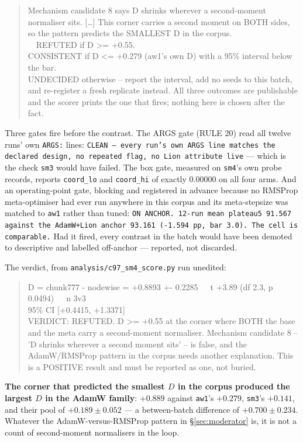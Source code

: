\documentclass[10pt,letterpaper]{article}
\newcommand{\Dstat}{D}                         %
\newcommand{\arm}[1]{\texttt{#1}}
\begin{document}
\begin{quote}\ttfamily\footnotesize
Mechanism candidate 8 says D shrinks wherever a second-moment normaliser sits. […] This corner
carries a second moment on BOTH sides, so the pattern predicts the SMALLEST D in the corpus.\\
\ \ REFUTED if D >= +0.55.\\
CONSISTENT if D <= +0.279 (aw1's own D) with a 95\% interval below the bar.\\
UNDECIDED otherwise -- report the interval, add no seeds to this batch, and re-register a fresh
replicate instead. All three outcomes are publishable and the scorer prints the one that fires;
nothing here is chosen after the fact.
\end{quote}

Three gates fire before the contrast. The ARGS gate (RULE 20) read all twelve runs' own
\texttt{ARGS:} lines: \texttt{CLEAN --- every run's own ARGS line matches the declared design, no
repeated flag, no Lion attribute live} --- which is the check \arm{sm3} would have failed. The box
gate, measured on \arm{sm4}'s own probe records, reports \texttt{coord\_lo} and \texttt{coord\_hi}
of exactly 0.00000 on all four arms. And an operating-point gate, blocking and registered in
advance because no RMSProp meta-optimiser had ever run anywhere in this corpus and its
meta-stepsize was matched to \arm{aw1} rather than tuned: \texttt{ON ANCHOR. 12-run mean plateau5
91.567 against the AdamW+Lion anchor 93.161 (-1.594 pp, bar 3.0). The cell is comparable.} Had it
fired, every contrast in the batch would have been demoted to descriptive and labelled off-anchor
--- reported, not discarded.

The verdict, from \texttt{analysis/c97\_sm4\_score.py} run unedited:

\begin{quote}\ttfamily\footnotesize
D = chunk777 - nodewise = +0.8893 +- 0.2285~~~t +3.89 (df 2.3, p 0.0494)~~~n 3v3\\
95\% CI [+0.4415, +1.3371]\\
VERDICT: REFUTED. D >= +0.55 at the corner where BOTH the base and the meta carry a second-moment
normaliser. Mechanism candidate 8 -- 'D shrinks wherever a second moment sits' -- is false, and
the AdamW/RMSProp pattern in the corpus needs another explanation. This is a POSITIVE result and
must be reported as one, not buried.
\end{quote}

\textbf{The corner that predicted the smallest $\Dstat$ in the corpus produced the largest
$\Dstat$ in the AdamW family}: $+0.889$ against \arm{aw1}'s $+0.279$, \arm{sm3}'s $+0.141$, and
their pool of $+0.189 \pm 0.052$ --- a between-batch difference of $+0.700 \pm 0.234$. Whatever
the AdamW-versus-RMSProp pattern in \S\ref{sec:moderator} is, it is not a count of second-moment
normalisers in the loop.
\end{document}
